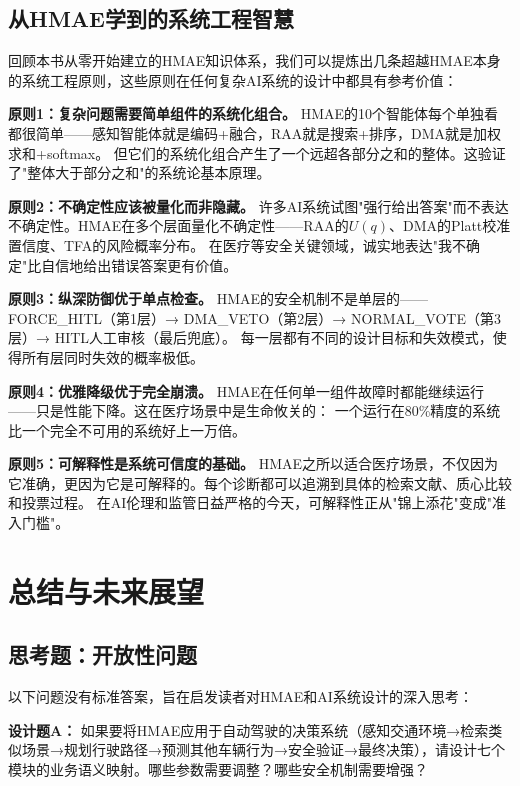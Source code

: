 \documentclass[11pt,a4paper]{ctexart}
\begin{document}
\newpage


\subsection{从HMAE学到的系统工程智慧}

回顾本书从零开始建立的HMAE知识体系，我们可以提炼出几条超越HMAE本身的系统工程原则，这些原则在任何复杂AI系统的设计中都具有参考价值：

\textbf{原则1：复杂问题需要简单组件的系统化组合。}
HMAE的10个智能体每个单独看都很简单——感知智能体就是编码+融合，RAA就是搜索+排序，DMA就是加权求和+softmax。
但它们的系统化组合产生了一个远超各部分之和的整体。这验证了"整体大于部分之和"的系统论基本原理。

\textbf{原则2：不确定性应该被量化而非隐藏。}
许多AI系统试图"强行给出答案"而不表达不确定性。HMAE在多个层面量化不确定性——RAA的$U(q)$、DMA的Platt校准置信度、TFA的风险概率分布。
在医疗等安全关键领域，诚实地表达"我不确定"比自信地给出错误答案更有价值。

\textbf{原则3：纵深防御优于单点检查。}
HMAE的安全机制不是单层的——FORCE\_HITL（第1层）→ DMA\_VETO（第2层）→ NORMAL\_VOTE（第3层）→ HITL人工审核（最后兜底）。
每一层都有不同的设计目标和失效模式，使得所有层同时失效的概率极低。

\textbf{原则4：优雅降级优于完全崩溃。}
HMAE在任何单一组件故障时都能继续运行——只是性能下降。这在医疗场景中是生命攸关的：
一个运行在80\%精度的系统比一个完全不可用的系统好上一万倍。

\textbf{原则5：可解释性是系统可信度的基础。}
HMAE之所以适合医疗场景，不仅因为它准确，更因为它是可解释的。每个诊断都可以追溯到具体的检索文献、质心比较和投票过程。
在AI伦理和监管日益严格的今天，可解释性正从"锦上添花"变成"准入门槛"。



\section{总结与未来展望}
\subsection{思考题：开放性问题}

以下问题没有标准答案，旨在启发读者对HMAE和AI系统设计的深入思考：

\textbf{设计题A：} 如果要将HMAE应用于自动驾驶的决策系统（感知交通环境→检索类似场景→规划行驶路径→预测其他车辆行为→安全验证→最终决策），请设计七个模块的业务语义映射。哪些参数需要调整？哪些安全机制需要增强？
\end{document}
